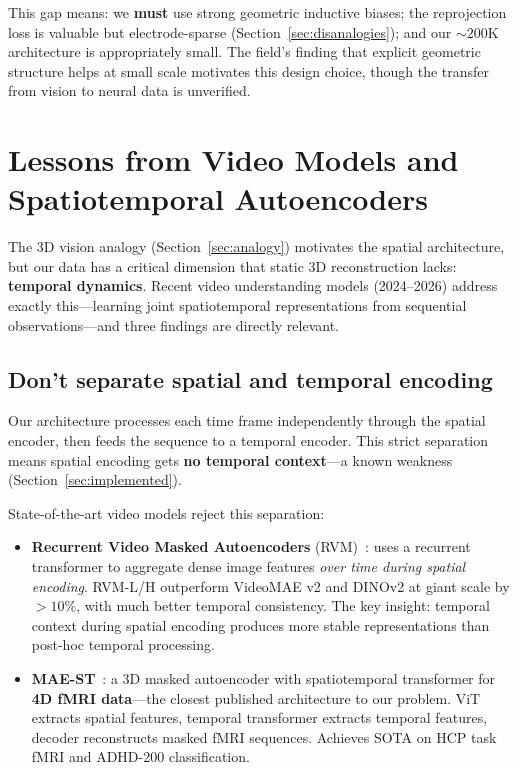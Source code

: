 \documentclass[11pt,letterpaper]{article}
\begin{document}
\noindent This gap means: we \textbf{must} use strong geometric inductive biases; the reprojection loss is valuable but electrode-sparse (Section~\ref{sec:disanalogies}); and our ${\sim}200$K architecture is appropriately small. The field's finding that explicit geometric structure helps at small scale motivates this design choice, though the transfer from vision to neural data is unverified.


\section{Lessons from Video Models and Spatiotemporal Autoencoders}\label{sec:video-lessons}

The 3D vision analogy (Section~\ref{sec:analogy}) motivates the spatial architecture, but our data has a critical dimension that static 3D reconstruction lacks: \textbf{temporal dynamics}. Recent video understanding models (2024--2026) address exactly this---learning joint spatiotemporal representations from sequential observations---and three findings are directly relevant.

\subsection{Don't separate spatial and temporal encoding}

Our architecture processes each time frame independently through the spatial encoder, then feeds the sequence to a temporal encoder. This strict separation means spatial encoding gets \textbf{no temporal context}---a known weakness (Section~\ref{sec:implemented}).

State-of-the-art video models reject this separation:
\begin{itemize}[leftmargin=2em]
\item \textbf{Recurrent Video Masked Autoencoders} (RVM)~\cite{rvm2025}: uses a recurrent transformer to aggregate dense image features \emph{over time during spatial encoding}. RVM-L/H outperform VideoMAE v2 and DINOv2 at giant scale by ${>}10\%$, with much better temporal consistency. The key insight: temporal context during spatial encoding produces more stable representations than post-hoc temporal processing.
\item \textbf{MAE-ST}~\cite{maest2025}: a 3D masked autoencoder with spatiotemporal transformer for \textbf{4D fMRI data}---the closest published architecture to our problem. ViT extracts spatial features, temporal transformer extracts temporal features, decoder reconstructs masked fMRI sequences. Achieves SOTA on HCP task fMRI and ADHD-200 classification.
\end{itemize}
\end{document}

